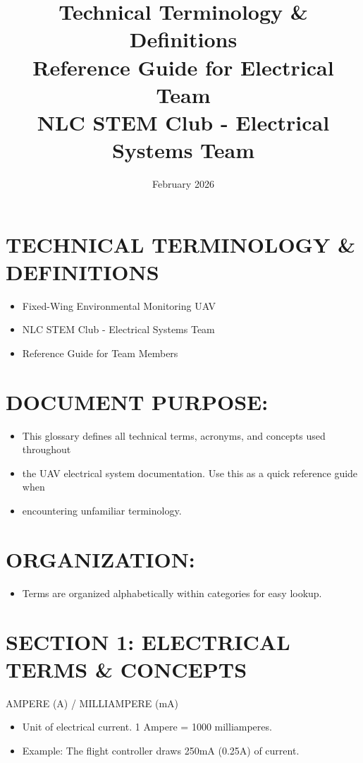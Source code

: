 \documentclass[11pt,letterpaper]{article}
\title{\Huge\textbf{Technical Terminology \& Definitions}\\
\Large Reference Guide for Electrical Team\\
\large NLC STEM Club - Electrical Systems Team}
\author{February 2026}
\date{}
\begin{document}
\maketitle
\thispagestyle{empty}
\newpage
\section{TECHNICAL TERMINOLOGY \& DEFINITIONS}

\begin{itemize}
  \item Fixed-Wing Environmental Monitoring UAV
  \item NLC STEM Club - Electrical Systems Team
  \item Reference Guide for Team Members
\end{itemize}

\section{DOCUMENT PURPOSE:}

\begin{itemize}
  \item This glossary defines all technical terms, acronyms, and concepts used throughout
  \item the UAV electrical system documentation. Use this as a quick reference guide when
  \item encountering unfamiliar terminology.
\end{itemize}

\section{ORGANIZATION:}

\begin{itemize}
  \item Terms are organized alphabetically within categories for easy lookup.
\end{itemize}

\section{SECTION 1: ELECTRICAL TERMS \& CONCEPTS}

AMPERE (A) / MILLIAMPERE (mA)\par

\begin{itemize}
  \item Unit of electrical current. 1 Ampere = 1000 milliamperes.
  \item Example: The flight controller draws 250mA (0.25A) of current.
\end{itemize}
\end{document}
